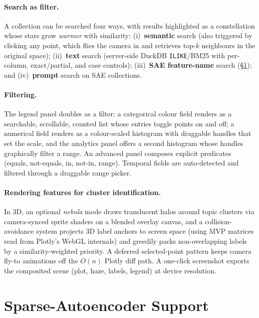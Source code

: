 \documentclass[11pt]{article}
\begin{document}
\paragraph{Search as filter.} A collection can be searched four ways, with
results highlighted as a constellation whose stars grow \emph{warmer} with
similarity: (i)~\textbf{semantic} search (also triggered by clicking any
point, which flies the camera in and retrieves top-$k$ neighbours in the
original space); (ii)~\textbf{text} search (server-side DuckDB
\texttt{ILIKE}/BM25 with per-column, exact/partial, and case controls);
(iii)~\textbf{SAE feature-name} search (\S\ref{sec:sae}); and
(iv)~\textbf{prompt} search on SAE collections.

\paragraph{Filtering.} The legend panel doubles as a filter: a categorical
colour field renders as a searchable, scrollable, counted list whose
entries toggle points on and off; a numerical field renders as a
colour-scaled histogram with draggable handles that set the scale, and the
analytics panel offers a second histogram whose handles graphically filter
a range. An advanced panel composes explicit predicates (equals, not-equals,
in, not-in, range). Temporal fields are auto-detected and filtered through a
draggable range picker.

\paragraph{Rendering features for cluster identification.} In 3D, an
optional \emph{nebula} mode draws translucent halos around topic clusters
via camera-synced sprite shaders on a blended overlay canvas, and a
collision-avoidance system projects 3D label anchors to screen space (using
MVP matrices read from Plotly's WebGL internals) and greedily packs
non-overlapping labels by a similarity-weighted priority. A deferred
selected-point pattern keeps camera fly-to animations off the $O(n)$ Plotly
diff path. A one-click screenshot exports the composited scene (plot, haze,
labels, legend) at device resolution.

\section{Sparse-Autoencoder Support}
\label{sec:sae}
\end{document}
